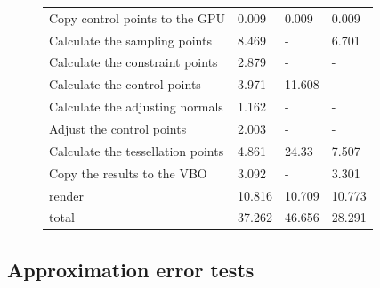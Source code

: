 \documentclass[3p]{elsarticle}
\begin{document}
\begin{figure}[htb]
\begin{minipage}[c]{0.7\textwidth}
\begin{tabular}{llll}
		\hline
		Copy control points to the GPU & 0.009 & 0.009 & 0.009 \\
		Calculate the sampling points & 8.469 & - & 6.701 \\
		Calculate the constraint points & 2.879 & - & - \\
		Calculate the control points & 3.971 & 11.608 & - \\
		Calculate the adjusting normals & 1.162 & - & - \\
		Adjust the control points & 2.003 & - & - \\
		Calculate the tessellation points & 4.861 & 24.33 & 7.507 \\
		Copy the results to the VBO & 3.092 & - & 3.301 \\
		render & 10.816 & 10.709 & 10.773 \\
		total & 37.262 & 46.656 & 28.291 \\
		\hline
	\end{tabular}
	\label{tab:compare}
  \end{minipage} 
\end{figure}

\subsection{Approximation error tests}
\end{document}
